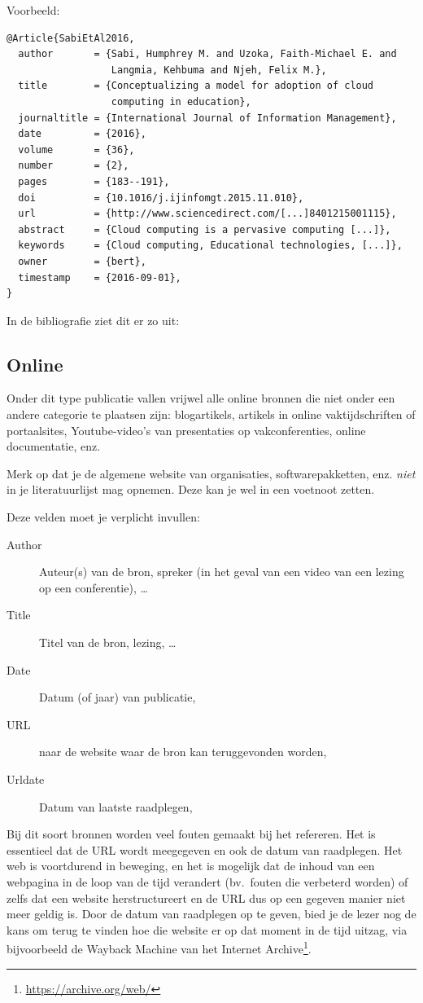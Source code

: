 Voorbeeld:
\begin{verbatim}
@Article{SabiEtAl2016,
  author       = {Sabi, Humphrey M. and Uzoka, Faith-Michael E. and
                  Langmia, Kehbuma and Njeh, Felix M.},
  title        = {Conceptualizing a model for adoption of cloud
                  computing in education},
  journaltitle = {International Journal of Information Management},
  date         = {2016},
  volume       = {36},
  number       = {2},
  pages        = {183--191},
  doi          = {10.1016/j.ijinfomgt.2015.11.010},
  url          = {http://www.sciencedirect.com/[...]8401215001115},
  abstract     = {Cloud computing is a pervasive computing [...]},
  keywords     = {Cloud computing, Educational technologies, [...]},
  owner        = {bert},
  timestamp    = {2016-09-01},
}
\end{verbatim}

In de bibliografie ziet dit er zo uit: 

\subsection{Online}%
\label{ssec:online}

Onder dit type publicatie vallen vrijwel alle online bronnen die niet onder een andere categorie te plaatsen zijn: blogartikels, artikels in online vaktijdschriften of portaalsites, Youtube-video's van presentaties op vakconferenties, online documentatie, enz.

Merk op dat je de algemene website van organisaties, softwarepakketten, enz. \emph{niet} in je literatuurlijst mag opnemen. Deze kan je wel in een voetnoot zetten.

Deze velden moet je verplicht invullen:

\begin{description}
  \item[Author] Auteur(s) van de bron, spreker (in het geval van een video van een lezing op een conferentie), \ldots
  \item[Title] Titel van de bron, lezing, \ldots
  \item[Date] Datum (of jaar) van publicatie,
  \item[URL] naar de website waar de bron kan teruggevonden worden,
  \item[Urldate] Datum van laatste raadplegen,
\end{description}

Bij dit soort bronnen worden veel fouten gemaakt bij het refereren. Het is essentieel dat de URL wordt meegegeven en ook de datum van raadplegen. Het web is voortdurend in beweging, en het is mogelijk dat de inhoud van een webpagina in de loop van de tijd verandert (bv.\ fouten die verbeterd worden) of zelfs dat een website herstructureert en de URL dus op een gegeven manier niet meer geldig is. Door de datum van raadplegen op te geven, bied je de lezer nog de kans om terug te vinden hoe die website er op dat moment in de tijd uitzag, via bijvoorbeeld de Wayback Machine van het Internet Archive\footnote{\url{https://archive.org/web/}}.

